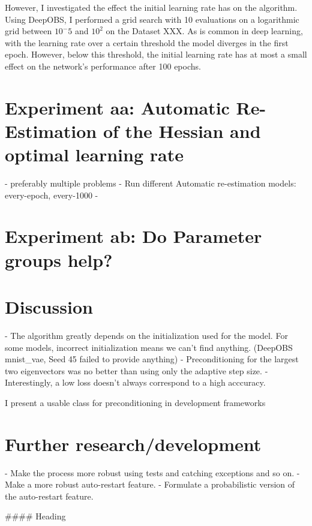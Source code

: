 \documentclass[twoside,12pt,a4paper]{report}
\begin{document}
However, I investigated the effect the initial learning rate has on the algorithm.
Using DeepOBS, I performed a grid search with 10 evaluations on a logarithmic grid between $10^-5$ and $10^2$ on the Dataset XXX.
As is common in deep learning, with the learning rate over a certain threshold the model diverges in the first epoch. However, below this threshold, the initial learning rate has at most a small effect on the network's performance after 100 epochs.

\section{Experiment aa: Automatic Re-Estimation of the Hessian and optimal learning rate}
- preferably multiple problems
- Run different Automatic re-estimation models: every-epoch, every-1000
- 

\section{Experiment ab: Do Parameter groups help?}



\section{Discussion}
\begin{markdown}
- The algorithm greatly depends on the initialization used for the model. For some models, incorrect initialization means we can't find anything. (DeepOBS mnist\_vae, Seed 45 failed to provide anything)
- Preconditioning for the largest two eigenvectors was no better than using only the adaptive step size.
- Interestingly, a low loss doesn't always correspond to a high acccuracy.


\end{markdown}

I present a usable class for preconditioning in development frameworks 
\section{Further research/development}
\begin{markdown}
- Make the process more robust using tests and catching exceptions and so on.
- Make a more robust auto-restart feature.
- Formulate a probabilistic version of the auto-restart feature.

#### Heading
\end{markdown}
\end{document}
